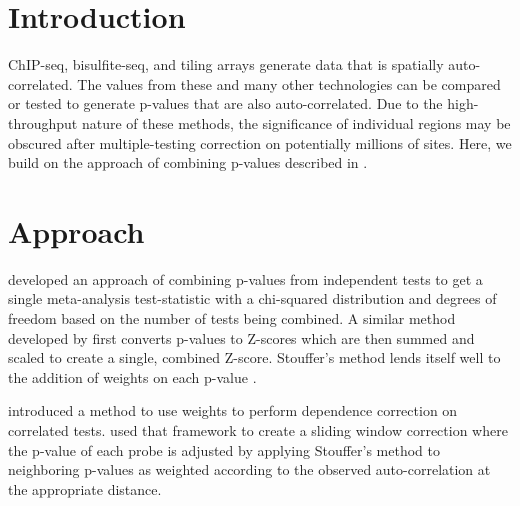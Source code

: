 \documentclass{bioinfo}
\begin{document}
\section{Introduction}
ChIP-seq, bisulfite-seq, and tiling arrays generate data that is spatially
auto-correlated. The values from these and many other technologies can be
compared or tested to generate p-values that are also auto-correlated. Due to the
high-throughput nature of these methods, the significance of individual regions
may be obscured after multiple-testing correction on potentially millions of sites.
Here, we build on the approach of combining p-values described in \citep{Kechris2010}.

\section{Approach}

\citep{Fisher} developed an approach of combining p-values from independent tests
to get a single meta-analysis test-statistic with a chi-squared distribution 
and degrees of freedom based on the number of tests being combined.
A similar method developed by \citep{Stouffer} first converts p-values
to Z-scores which are then summed and scaled to create a single, combined Z-score.
Stouffer's method lends itself well to the addition of weights on each p-value
\citep{Liptak}.

\citep{Zaykin} introduced a method to use weights to perform dependence
correction on correlated tests.
\citep{Kechris2010} used that framework to create a sliding window correction where
the p-value of each probe is adjusted by applying Stouffer's method to neighboring
p-values as weighted according to the observed auto-correlation at the appropriate
distance.
\end{document}
